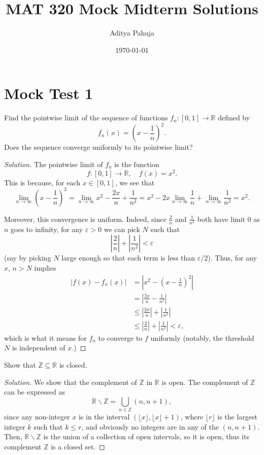 \documentclass[11pt]{scrartcl}
\title{\vspace{-2.0cm} MAT 320 Mock Midterm Solutions}
\author{\large Aditya Pahuja}
\date{\large \today}
\providecommand{\eps}{\varepsilon}
\providecommand{\RR}{\mathbb R}
\providecommand{\ZZ}{\mathbb Z}
\providecommand{\setdiff}{\smallsetminus}
\providecommand{\abs}[1]{\left|#1\right|}
\newenvironment{soln}{\begin{proof}[Solution]}{\end{proof}}
\begin{document}
\maketitle
\tableofcontents
\pagebreak

\section{Mock Test 1}
\begin{problem}
	Find the pointwise limit of the sequence of functions
	$f_n\colon[0,1]\to\RR$ defined by
	\[f_n(x) = \left(x - \frac 1n\right)^2.\]
	Does the sequence converge uniformly to its pointwise limit?
\end{problem}

\begin{soln}
	The pointwise limit of $f_n$ is the function
	\[\boxed{f\colon[0,1]\to\RR,\quad f(x) = x^2}.\]
	This is because, for each $x\in[0,1]$, we see that
	\[\lim_{n\to\infty} \left(x - \frac 1n\right)^2 =
	\lim_{n\to\infty} x^2 - \frac{2x}{n} + \frac{1}{n^2}
	= x^2 - 2x\lim_{n\to\infty} \frac 1n + \lim_{n\to\infty} \frac{1}{n^2}
	= x^2.\]
	
	Moreover, this convergence is uniform.
	Indeed, since $\frac2n$ and $\frac{1}{n^2}$ both have limit $0$
	as $n$ goes to infinity,
	for any $\eps > 0$ we can pick $N$ such that
	\[\abs{\frac 2n} + \abs{\frac{1}{n^2}} < \eps\]
	(say by picking $N$ large enough so that each term is less than $\eps/2$).
	Thus, for any $x$, $n > N$ implies
	\begin{align*}
		|f(x) - f_n(x)| &= \abs{x^2 - \left(x - \frac 1n\right)^2}\\
		&= \abs{\frac{2x}{n} - \frac{1}{n^2}}\\
		&\le \abs{\frac {2x}n} + \abs{\frac1{n^2}}\\
		&\le \abs{\frac 2n} + \abs{\frac{1}{n^2}} < \eps,
	\end{align*}
	which is what it means for $f_n$ to converge to $f$ uniformly
	(notably, the threshold $N$ is independent of $x$.)
\end{soln}

\pagebreak 
\begin{problem}
	Show that $\ZZ\subseteq\RR$ is closed.
\end{problem}

\begin{soln}
	We show that the complement of $\ZZ$ in $\RR$ is open.
	The complement of $\ZZ$ can be expressed as
	\[\RR\setdiff\ZZ = \bigcup_{n\in\ZZ}(n, n+1),\]
	since any non-integer $x$ is in the interval
	$(\lfloor x\rfloor, \lfloor x\rfloor + 1)$,
	where $\lfloor r\rfloor$ is the largest integer $k$
	such that $k\le r$,
	and obviously no integers are in any of the $(n, n+1)$.
	Then, $\RR\setdiff\ZZ$ is the union of a collection of open intervals,
	so it is open, thus its complement $\ZZ$ is a closed set.
\end{soln}
\end{document}
